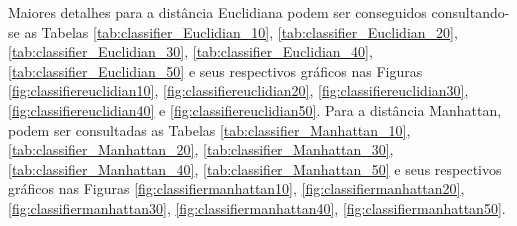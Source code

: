 		\par Maiores detalhes para a distância Euclidiana podem ser conseguidos consultando-se as Tabelas \ref{tab:classifier_Euclidian_10}, \ref{tab:classifier_Euclidian_20}, \ref{tab:classifier_Euclidian_30}, \ref{tab:classifier_Euclidian_40},  \ref{tab:classifier_Euclidian_50} e seus respectivos gráficos nas Figuras \ref{fig:classifiereuclidian10}, \ref{fig:classifiereuclidian20}, \ref{fig:classifiereuclidian30}, \ref{fig:classifiereuclidian40} e \ref{fig:classifiereuclidian50}. Para a distância Manhattan, podem ser consultadas as Tabelas 	\ref{tab:classifier_Manhattan_10}, \ref{tab:classifier_Manhattan_20}, \ref{tab:classifier_Manhattan_30}, \ref{tab:classifier_Manhattan_40}, \ref{tab:classifier_Manhattan_50} e seus respectivos gráficos nas Figuras		 
		 \ref{fig:classifiermanhattan10}, \ref{fig:classifiermanhattan20}, 	 \ref{fig:classifiermanhattan30}, \ref{fig:classifiermanhattan40},  \ref{fig:classifiermanhattan50}.
		
		
			
